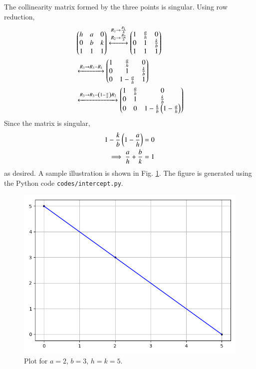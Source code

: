 \documentclass[journal,12pt,twocolumn]{IEEEtran}
\begin{document}
\begin{enumerate}
    \solution The collinearity matrix formed by the three points is singular.
    Using row reduction,
    \begin{align}
        &\begin{pmatrix}h&a&0\\0&b&k\\1&1&1\end{pmatrix} \xleftrightarrow[]
        {\substack{R_1\rightarrow\frac{R_1}{h}\\R_2\rightarrow\frac{R_2}{b}}}
        \begin{pmatrix}1&\frac{a}{h}&0\\0&1&\frac{k}{b}\\1&1&1\end{pmatrix} \\
        &\xleftrightarrow[]{R_3\rightarrow R_3-R_1}
        \begin{pmatrix}1&\frac{a}{h}&0\\0&1&\frac{k}{b}\\0&1-\frac{a}{h}&1\end{pmatrix} \\
        &\xleftrightarrow[]{R_3\rightarrow R_3-\ensuremath{\left(1-\frac{a}{h}\right)}R_2}
        \begin{pmatrix}1&\frac{a}{h}&0\\0&1&\frac{k}{b}\\0&0&1 - \frac{k}{b}\left(1-\frac{a}{h}\right)\end{pmatrix}
        \label{eq:row-red}
    \end{align}
    Since the matrix is singular,
    \begin{align}
        1 - \frac{k}{b}\left(1-\frac{a}{h}\right) = 0 \\
        \implies \frac{a}{h} + \frac{b}{k} = 1
        \label{eq:proof}
    \end{align}
    as desired. A sample illustration is shown in Fig. \ref{fig:example}. The 
    figure is generated using the Python code \texttt{codes/intercept.py}.
    \begin{figure}[!ht]
        \centering
        \includegraphics[width=\columnwidth]{figs/intercept.png}
        \caption{Plot for $a = 2$, $b = 3$, $h = k = 5$.}
        \label{fig:example}
    \end{figure}
\end{enumerate}
\end{document}
